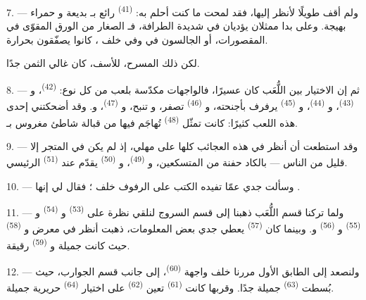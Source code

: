 7. --- ولم أقف طويلًا لأنظر إليها، فقد لمحت ما كنت أحلم به:
 \textsuperscript{(41)} رائع بـ بديعة
و حمراء بهيجة. وعلى  بدا ممثلان يؤديان
 في  شديدة الطرافة، فـ
الصغار من الورق المقوّى في المقصورات، أو الجالسون في  وفي
 خلف ، كانوا يصفّقون بحرارة.

لكن ذلك المسرح، للأسف، كان غالي الثمن جدًا.

8. --- ثم إن الاختيار بين اللُّعَب كان عسيرًا، فالواجهات مكدّسة بلعب من كل
نوع:  \textsuperscript{(42)}، و \textsuperscript{(43)}،
و \textsuperscript{(44)}، و \textsuperscript{(45)} يرفرف
بأجنحته، و \textsuperscript{(46)} تصفر، و تنبح،
و \textsuperscript{(47)}، و. وقد أضحكتني
إحدى هذه اللعب كثيرًا: كانت تمثّل  \textsuperscript{(48)}
تُهاجَم فيها  من  قبالة شاطئ مغروس
بـ.


9. --- وقد استطعت أن أنظر في هذه العجائب كلها على مهلي، إذ لم يكن في
المتجر إلا قليل من الناس --- بالكاد حفنة من المتسكعين، و
\textsuperscript{(49)}، و \textsuperscript{(50)} يقدّم
 عند  \textsuperscript{(51)} الرئيسي.

10. --- وسألت جدي عمّا تفيده الكتب على الرفوف خلف ؛
فقال لي إنها .

\VUsaut{3.6mm}
\VUsaut{2.8mm}

11. --- ولما تركنا قسم اللُّعَب ذهبنا إلى قسم السروج لنلقي نظرة على
 \textsuperscript{(53)} و \textsuperscript{(54)}
و \textsuperscript{(55)} و \textsuperscript{(56)}
و. وبينما كان  \textsuperscript{(57)} يعطي جدي
بعض المعلومات، ذهبت أنظر في معرض  و
\textsuperscript{(58)} حيث كانت  جميلة و
\textsuperscript{(59)} رقيقة.

12. --- ولنصعد إلى الطابق الأول مررنا خلف واجهة 
\textsuperscript{(60)}، إلى جانب قسم الجوارب، حيث بُسطت 
\textsuperscript{(63)} جميلة جدًا. وقربها كانت  \textsuperscript{(61)}
تعين  \textsuperscript{(62)} على اختيار 
\textsuperscript{(64)} حريرية جميلة.

